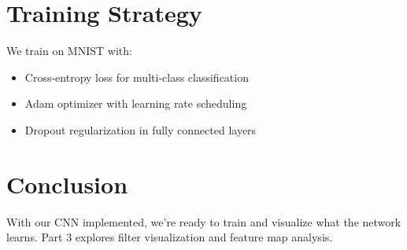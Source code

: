 \documentclass[12pt]{article}
\begin{document}
\section{Training Strategy}
We train on MNIST with:
\begin{itemize}
    \item Cross-entropy loss for multi-class classification
    \item Adam optimizer with learning rate scheduling
    \item Dropout regularization in fully connected layers
\end{itemize}

\section{Conclusion}
With our CNN implemented, we're ready to train and visualize what the network learns. Part 3 explores filter visualization and feature map analysis.
\end{document}
